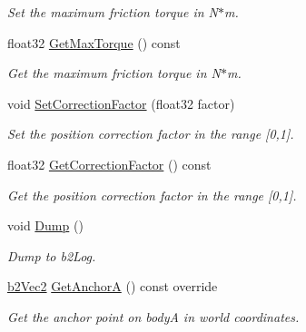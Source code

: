 \begin{DoxyCompactItemize}
\begin{DoxyCompactList}\small\item\em Set the maximum friction torque in N$\ast$m. \end{DoxyCompactList}\item 
\mbox{\label{classb2MotorJoint_a40d4e4e852a6a722708f0c47b5c9fd69}} 
float32 \hyperlink{classb2MotorJoint_a40d4e4e852a6a722708f0c47b5c9fd69}{Get\+Max\+Torque} () const
\begin{DoxyCompactList}\small\item\em Get the maximum friction torque in N$\ast$m. \end{DoxyCompactList}\item 
\mbox{\label{classb2MotorJoint_ae59e624b8a7b6f869ab5e6148352cb52}} 
void \hyperlink{classb2MotorJoint_ae59e624b8a7b6f869ab5e6148352cb52}{Set\+Correction\+Factor} (float32 factor)
\begin{DoxyCompactList}\small\item\em Set the position correction factor in the range \mbox{[}0,1\mbox{]}. \end{DoxyCompactList}\item 
\mbox{\label{classb2MotorJoint_a429f9656d9f39e6e992de59c9620d6c6}} 
float32 \hyperlink{classb2MotorJoint_a429f9656d9f39e6e992de59c9620d6c6}{Get\+Correction\+Factor} () const
\begin{DoxyCompactList}\small\item\em Get the position correction factor in the range \mbox{[}0,1\mbox{]}. \end{DoxyCompactList}\item 
\mbox{\label{classb2MotorJoint_a5d23974c2fc23f64426a8321520e45bb}} 
void \hyperlink{classb2MotorJoint_a5d23974c2fc23f64426a8321520e45bb}{Dump} ()
\begin{DoxyCompactList}\small\item\em Dump to b2\+Log. \end{DoxyCompactList}\item 
\mbox{\label{classb2MotorJoint_a58adfab0fe79d254347a367341b0963a}} 
\hyperlink{structb2Vec2}{b2\+Vec2} \hyperlink{classb2MotorJoint_a58adfab0fe79d254347a367341b0963a}{Get\+AnchorA} () const override
\begin{DoxyCompactList}\small\item\em Get the anchor point on bodyA in world coordinates. \end{DoxyCompactList}\item 

\end{DoxyCompactItemize}
